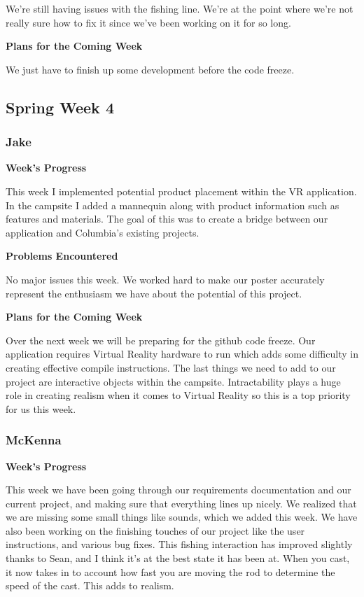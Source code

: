 \documentclass[10pt,journal,compsoc,onecolumn, draftclsnofoot]{IEEEtran}
\begin{document}
We're still having issues with the fishing line. We're at the point where we're not really sure how to fix it since we've been working on it for so long.

\noindent \textbf{Plans for the Coming Week}

We just have to finish up some development before the code freeze.

\subsection{Spring Week 4}
\subsubsection{Jake}
\noindent \textbf{Week's Progress}

This week I implemented potential product placement within the VR application. In the campsite I added a mannequin along with product information such as features and materials. The goal of this was to create a bridge between our application and Columbia's existing projects.

\noindent \textbf{Problems Encountered}

No major issues this week. We worked hard to make our poster accurately represent the enthusiasm we have about the potential of this project.

\noindent \textbf{Plans for the Coming Week}

Over the next week we will be preparing for the github code freeze. Our application requires Virtual Reality hardware to run which adds some difficulty in creating effective compile instructions. The last things we need to add to our project are interactive objects within the campsite. Intractability plays a huge role in creating realism when it comes to Virtual Reality so this is a top priority for us this week.

\subsubsection{McKenna}
\noindent \textbf{Week's Progress}

This week we have been going through our requirements documentation and our current project, and making sure that everything lines up nicely. We realized that we are missing some small things like sounds, which we added this week. We have also been working on the finishing touches of our project like the user instructions, and various bug fixes. This fishing interaction has improved slightly thanks to Sean, and I think it's at the best state it has been at. When you cast, it now takes in to account how fast you are moving the rod to determine the speed of the cast. This adds to realism.
\end{document}
